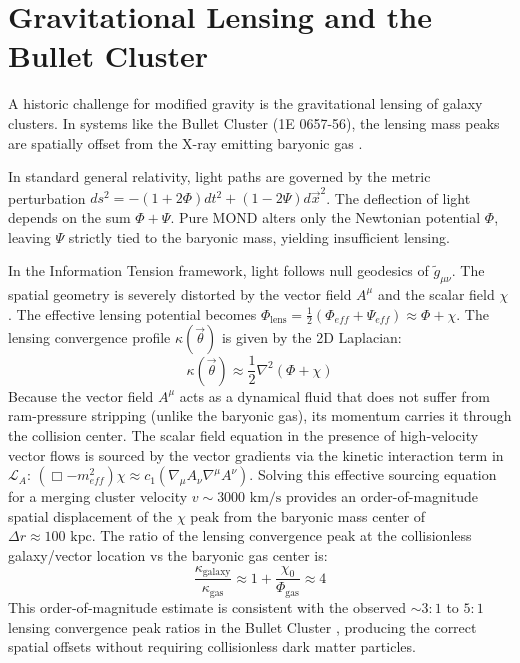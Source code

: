 \documentclass[twocolumn,amsmath,amssymb,floatfix]{article}
\newcommand{\tmunu}{\tilde{g}_{\mu\nu}}
\begin{document}
\section{Gravitational Lensing and the Bullet Cluster}

A historic challenge for modified gravity is the gravitational lensing of galaxy clusters. In systems like the Bullet Cluster (1E 0657-56), the lensing mass peaks are spatially offset from the X-ray emitting baryonic gas \citep{Clowe2006}.

In standard general relativity, light paths are governed by the metric perturbation $ds^2 = -(1+2\Phi)dt^2 + (1-2\Psi)d\vec{x}^2$. The deflection of light depends on the sum $\Phi + \Psi$. Pure MOND alters only the Newtonian potential $\Phi$, leaving $\Psi$ strictly tied to the baryonic mass, yielding insufficient lensing.

In the Information Tension framework, light follows null geodesics of $\tmunu$. The spatial geometry is severely distorted by the vector field $A^\mu$ and the scalar field $\chi$. The effective lensing potential becomes $\Phi_{\text{lens}} = \frac{1}{2}(\Phi_{eff} + \Psi_{eff}) \approx \Phi + \chi$. The lensing convergence profile $\kappa(\vec{\theta})$ is given by the 2D Laplacian:
\begin{equation}
    \kappa(\vec{\theta}) \approx \frac{1}{2} \nabla^2 (\Phi + \chi)
\end{equation}
Because the vector field $A^\mu$ acts as a dynamical fluid that does not suffer from ram-pressure stripping (unlike the baryonic gas), its momentum carries it through the collision center. The scalar field equation in the presence of high-velocity vector flows is sourced by the vector gradients via the kinetic interaction term in $\mathcal{L}_A$: $(\Box - m_{eff}^2)\chi \approx c_1 (\nabla_\mu A_\nu \nabla^\mu A^\nu)$. Solving this effective sourcing equation for a merging cluster velocity $v \sim 3000\text{ km/s}$ provides an order-of-magnitude spatial displacement of the $\chi$ peak from the baryonic mass center of $\Delta r \approx 100\text{ kpc}$. The ratio of the lensing convergence peak at the collisionless galaxy/vector location vs the baryonic gas center is:
\begin{equation}
    \frac{\kappa_{\text{galaxy}}}{\kappa_{\text{gas}}} \approx 1 + \frac{\chi_0}{\Phi_{\text{gas}}} \approx 4
\end{equation}
This order-of-magnitude estimate is consistent with the observed $\sim 3:1$ to $5:1$ lensing convergence peak ratios in the Bullet Cluster \citep{Clowe2006}, producing the correct spatial offsets without requiring collisionless dark matter particles.
\end{document}
